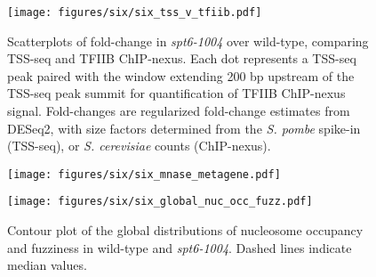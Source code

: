 \lipsum[1]


\begin{figure}[h]
\centering
\texttt{[image: figures/six/six\_tss\_v\_tfiib.pdf]}
\caption{Scatterplots of fold-change in \textit{spt6-1004} over wild-type, comparing TSS-seq and TFIIB ChIP-nexus. Each dot represents a TSS-seq peak paired with the window extending 200 bp upstream of the TSS-seq peak summit for quantification of TFIIB ChIP-nexus signal. Fold-changes are regularized fold-change estimates from DESeq2, with size factors determined from the \textit{S. pombe} spike-in (TSS-seq), or \textit{S. cerevisiae} counts (ChIP-nexus).}
\end{figure}

\lipsum[1]

\begin{figure}[H]
    \centering
    \begin{minipage}[t]{2.875in}
        \centering
        \texttt{[image: figures/six/six\_mnase\_metagene.pdf]}
        \caption{Average MNase-seq dyad signal in wild-type and \textit{spt6-1004}, over 3522 non-overlapping genes aligned by wild-type +1 nucleosome dyad. Values are the mean of spike-in normalized coverage in non-overlapping 20 bp bins, averaged over two replicates (\textit{spt6-1004}) or one experiment (wild-type). The solid line and shading are the median and the inter-quartile range.}
        \label{fig:six_mnase_metagene}
    \end{minipage}\hfill
    \begin{minipage}[t]{2.875in}
        \centering
        \texttt{[image: figures/six/six\_global\_nuc\_occ\_fuzz.pdf]}
        \caption{Contour plot of the global distributions of nucleosome occupancy and fuzziness in wild-type and \textit{spt6-1004}. Dashed lines indicate median values.}
        \label{fig:six_global_nuc_fuzz}
    \end{minipage}
\end{figure}

